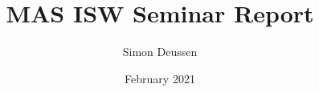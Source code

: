 \documentclass{report}
\title{MAS ISW Seminar Report}
\date{February 2021}
\author{Simon Deussen}
\begin{document}
\begin{titlepage}
    \maketitle
\end{titlepage}


\newpage
\tableofcontents
\newpage







\newpage


\end{document}
